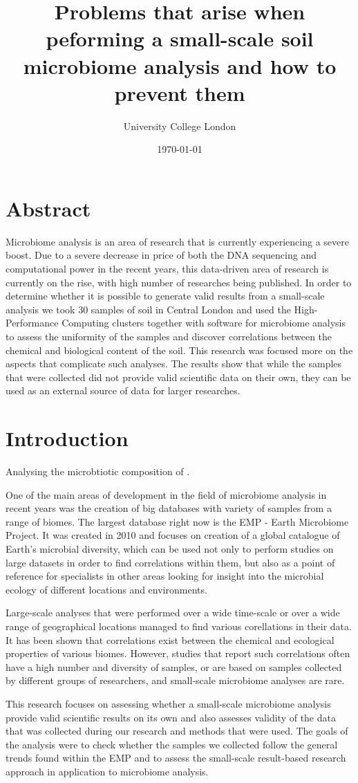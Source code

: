 \documentclass[12pt,twocolumn]{article} %
\title{Problems that arise when peforming a small-scale soil microbiome analysis and how to prevent them}
\author{\normalsize University College London \\}
\date{\today}
\begin{document}
	
\maketitle
%
%
\section{Abstract}
Microbiome analysis is an area of research that is currently experiencing a severe boost. Due to a severe decrease in price of both the DNA sequencing and computational power in the recent years, this data-driven area of research is currently on the rise, with high number of researches being published. In order to determine whether it is possible to generate valid results from a small-scale analysis we took 30 samples of soil in Central London and used the High-Performance Computing clusters together with software for microbiome analysis to assess the uniformity of the samples and discover correlations between the chemical and biological content of the soil. This research was focused more on the aspects that complicate such analyses. The results show that while the samples that were collected did not provide valid scientific data on their own, they can be used as an external source of data for larger researches.
\section{Introduction}
Analysing the microbtiotic composition of .
\par
One of the main areas of development in the field of microbiome analysis in recent years was the creation of big databases with variety of samples from a range of biomes. The largest database right now is the EMP - Earth Microbiome Project\cite{Gilbert2014}. It was created in 2010 and focuses on creation of a global catalogue of Earth's microbial diversity, which can be used not only to perform studies on large datasets in order to find correlations within them, but also as a point of reference for specialists in other areas looking for insight into the microbial ecology of different locations and environments.
\par
Large-scale analyses that were performed over a wide time-scale or over a wide range of geographical locations managed to find various corellations in their data. It has been shown that correlations exist between the chemical and ecological properties of various biomes\cite{Thompson2017,Zhalnina2014,Martins2013}. However, studies that report such correlations often have a high number and diversity of samples, or are based on samples collected by different groups of researchers, and small-scale microbiome analyses are rare.
\par
This research focuses on assessing whether a small-scale microbiome analysis provide valid scientific results on its own and also assesses validity of the data that was collected during our research and methods that were used.  The goals of the analysis were to check whether the samples we collected follow the general trends found within the EMP and to assess the small-scale result-based research approach in application to microbiome analysis.
%
%
\end{document}
